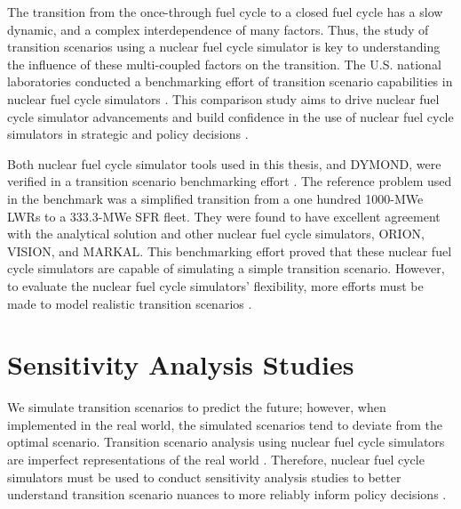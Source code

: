 The transition from the once-through fuel cycle to a closed fuel cycle 
has a slow dynamic, and a complex interdependence of many factors. 
Thus, the study of transition scenarios using a nuclear fuel cycle simulator 
is key to understanding the influence of these multi-coupled factors on the transition. 
The U.S. national laboratories conducted a benchmarking effort
of transition scenario capabilities in nuclear fuel cycle simulators
\cite{feng_standardized_2016,guerin_benchmark_2009}. 
This comparison study aims to drive nuclear fuel cycle simulator advancements and build 
confidence in the use of nuclear fuel cycle simulators in 
strategic and policy decisions \cite{feng_standardized_2016}. 

Both nuclear fuel cycle simulator tools used in this thesis, \Cyclus and DYMOND,
were verified in a transition scenario benchmarking effort
\cite{feng_standardized_2016,bae_standardized_2019}.
The reference problem used in the benchmark was a simplified 
transition from a one hundred 1000-MWe \glspl{LWR} to a 
333.3-MWe \gls{SFR} fleet. 
They were found to have excellent agreement with the 
analytical solution and other nuclear fuel cycle simulators, 
ORION, VISION, and MARKAL.  
This benchmarking effort proved that these nuclear fuel cycle simulators
are capable of simulating a simple transition scenario. 
However, to evaluate the nuclear fuel cycle simulators' flexibility, 
more efforts must be made to model realistic transition scenarios
\cite{feng_standardized_2016}.

\section{Sensitivity Analysis Studies}


We simulate transition scenarios to predict the future; 
however, when implemented in the real world, the simulated 
scenarios tend to deviate from the optimal scenario.
Transition scenario analysis using nuclear fuel cycle simulators 
are imperfect representations of the real world \cite{noauthor_effects_2017}.
Therefore, nuclear fuel cycle simulators must be used to conduct
sensitivity analysis studies to better understand 
transition scenario nuances to
more reliably inform policy decisions \cite{passerini_systematic_2014}. 


